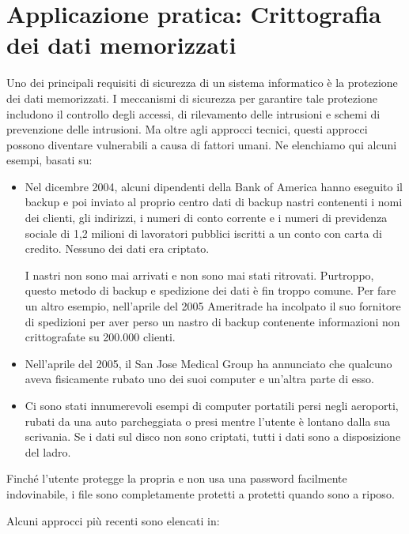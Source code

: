 \section{Applicazione pratica: Crittografia dei dati memorizzati}
Uno dei principali requisiti di sicurezza di un sistema informatico è la protezione dei dati memorizzati. I meccanismi di sicurezza per garantire tale protezione includono il controllo degli accessi, di rilevamento delle intrusioni e schemi di prevenzione delle intrusioni. Ma oltre agli approcci tecnici, questi approcci possono diventare vulnerabili a causa di fattori umani. Ne elenchiamo qui alcuni esempi, basati su:
\begin{itemize}
    \item Nel dicembre 2004, alcuni dipendenti della Bank of America hanno eseguito il backup e poi inviato al proprio centro dati di backup nastri contenenti i nomi dei clienti, gli indirizzi, i numeri di conto corrente e i numeri di previdenza sociale di 1,2 milioni di lavoratori pubblici iscritti a un conto con carta di credito. Nessuno dei dati era criptato. 
    
    I nastri non sono mai arrivati e non sono mai stati ritrovati. Purtroppo, questo metodo di backup e spedizione dei dati è fin troppo comune. Per fare un altro esempio, nell'aprile del 2005 Ameritrade ha incolpato il suo fornitore di spedizioni per aver perso un nastro di backup contenente informazioni non crittografate su 200.000 clienti.
    
    \item Nell'aprile del 2005, il San Jose Medical Group ha annunciato che qualcuno aveva fisicamente rubato uno dei suoi computer e un'altra parte di esso.
    
    \item Ci sono stati innumerevoli esempi di computer portatili persi negli aeroporti, rubati da una auto parcheggiata o presi mentre l'utente è lontano dalla sua scrivania. Se i dati sul disco non sono criptati, tutti i dati sono a disposizione del ladro.
\end{itemize}
Finché l'utente protegge la propria e non usa una password facilmente indovinabile, i file sono completamente protetti a protetti quando sono a riposo. 

\singlespacing

Alcuni approcci più recenti sono elencati in:

